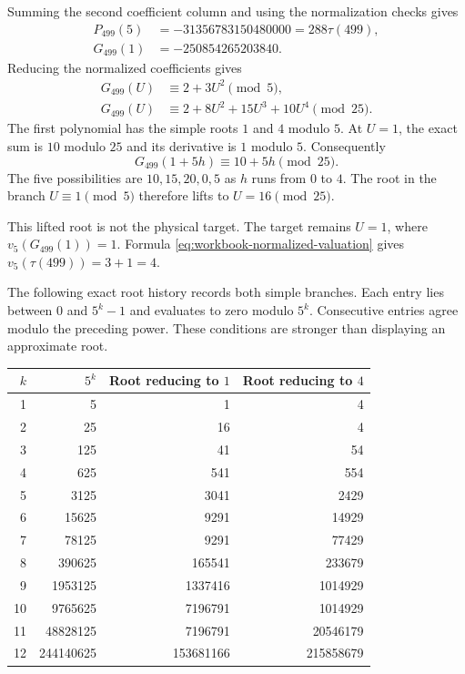 Summing the second coefficient column and using the normalization checks gives
\begin{align*}
 P_{499}(5)&=-31356783150480000=288\tau(499),\\
 G_{499}(1)&=-250854265203840.
\end{align*}
Reducing the normalized coefficients gives
\begin{align*}
 G_{499}(U)&\equiv2+3U^2\pmod5,\\
 G_{499}(U)&\equiv2+8U^2+15U^3+10U^4\pmod{25}.
\end{align*}
The first polynomial has the simple roots $1$ and $4$ modulo $5$. At $U=1$, the exact sum is $10$ modulo $25$ and its derivative is $1$ modulo $5$. Consequently
\[
 G_{499}(1+5h)\equiv10+5h\pmod{25}.
\]
The five possibilities are $10,15,20,0,5$ as $h$ runs from $0$ to $4$. The root in the branch $U\equiv1\pmod5$ therefore lifts to $U=16\pmod{25}$.

This lifted root is not the physical target. The target remains $U=1$, where $v_5(G_{499}(1))=1$. Formula \eqref{eq:workbook-normalized-valuation} gives $v_5(\tau(499))=3+1=4$.

The following exact root history records both simple branches. Each entry lies between $0$ and $5^k-1$ and evaluates to zero modulo $5^k$. Consecutive entries agree modulo the preceding power. These conditions are stronger than displaying an approximate root.

\begin{center}
\begin{tabular}{r r r r}
\toprule
$k$ & $5^k$ & Root reducing to $1$ & Root reducing to $4$\\
\midrule
1 & 5 & 1 & 4\\
2 & 25 & 16 & 4\\
3 & 125 & 41 & 54\\
4 & 625 & 541 & 554\\
5 & 3125 & 3041 & 2429\\
6 & 15625 & 9291 & 14929\\
7 & 78125 & 9291 & 77429\\
8 & 390625 & 165541 & 233679\\
9 & 1953125 & 1337416 & 1014929\\
10 & 9765625 & 7196791 & 1014929\\
11 & 48828125 & 7196791 & 20546179\\
12 & 244140625 & 153681166 & 215858679\\
\bottomrule
\end{tabular}
\end{center}

